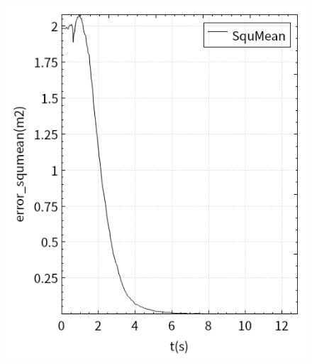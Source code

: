 \documentclass[fontset=fandol,type=bachelor,campus=harbin,bsmainpagenumberline=true]{hithesisbook}
\begin{document}
\begin{figure}[h]
{\begin{minipage}[h]{0.40\textwidth}
   		 	\includegraphics[width=1\textwidth]{chapter5/自适应控制器/error_squmean0}
    		\end{minipage}
		\label{视觉伺服曲线（自适应）b}
    	}
	\\ 
\end{figure}
\end{document}
